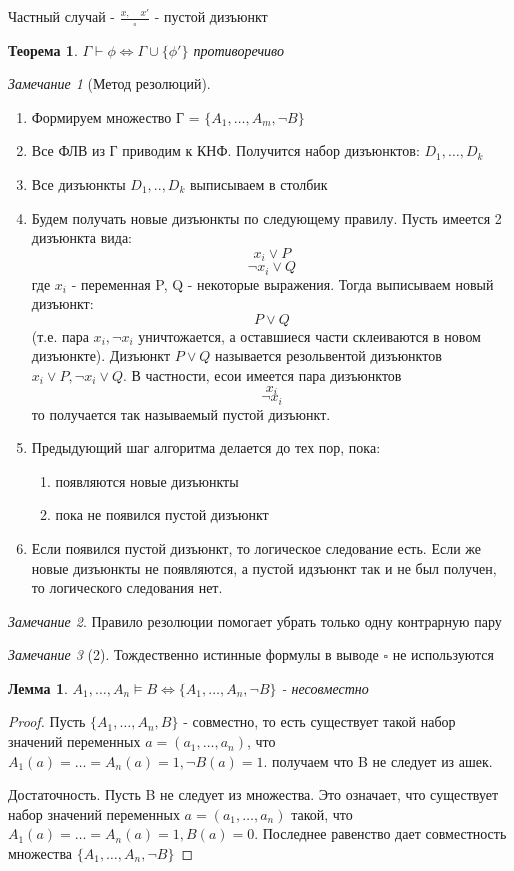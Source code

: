 \documentclass[a4paper]{article}
\newtheorem{theorem}{Теорема}[section]
\newtheorem{lemma}{Лемма}[section]
\theoremstyle{definition}
\theoremstyle{remark}
\newtheorem*{remark}{Замечание}
\begin{document}
    Частный случай - $\frac{x, \quad x'}{\square}$ - пустой дизъюнкт
    \begin{theorem}
		$\Gamma \vdash \phi \Leftrightarrow \Gamma \cup \{\phi'\}$ противоречиво
	\end{theorem}
	\begin{remark}[Метод резолюций]
		\begin{enumerate}
			\item Формируем множество Г = $\{A_1, \dots, A_m, \neg B\}$
			\item Все ФЛВ из Г приводим к КНФ. Получится набор дизъюнктов: $D_1, \dots, D_k$
			\item Все дизъюнкты $D_1, .., D_k$ выписываем в столбик
			\item  Будем получать новые дизъюнкты по следующему правилу. Пусть имеется 2 дизъюнкта вида: $$x_i \vee P$$ $$\neg x_i \vee Q$$
			где $x_i$ - переменная P, Q - некоторые выражения. Тогда выписываем новый дизъюнкт: $$P \vee Q$$
			(т.е. пара $x_i, \neg x_i$ уничтожается, а оставшиеся части склеиваются в новом дизъюнкте). Дизъюнкт $P \vee Q$ называется резольвентой дизъюнктов $x_i \vee P, \neg x_i \vee Q.$ В частности, есои имеется пара дизъюнктов $$x_i$$ $$\neg x_i$$ то получается так называемый пустой дизъюнкт.
			\item Предыдующий шаг алгоритма делается до тех пор, пока:
			\begin{enumerate}
				\item появляются новые дизъюнкты
				\item пока не появился пустой дизъюнкт
			\end{enumerate}
			\item Если появился пустой дизъюнкт, то логическое следование есть. Если же новые дизъюнкты не появляются, а пустой идзъюнкт так и не был получен, то логического следования нет.
		\end{enumerate}
	\end{remark}
    \begin{remark}
        Правило резолюции помогает убрать только одну контрарную пару
    \end{remark}
    \begin{remark}[2]
        Тождественно истинные формулы в выводе $\square$ не используются
    \end{remark}
    \begin{lemma}
        $A_1, \dots, A_n \models B\Leftrightarrow \{A_1, \dots, A_n, \neg B\}$ - несовместно
    \end{lemma}
    \begin{proof}
        Пусть $\{A_1, \dots, A_n, B\}$ - совместно, то есть существует такой набор значений переменных
        $a = (a_1, \dots, a_n)$, что $A_1(a) =\dots = A_n(a) = 1, \neg B(a) = 1$. получаем что B не следует из ашек.

        Достаточность. Пусть B не следует из множества. Это означает, что существует набор значений переменных 
        $a = (a_1, \dots, a_n)$ такой, что $A_1(a) =\dots = A_n(a) = 1, B(a) = 0$. Последнее равенство дает совместность множества
        $\{A_1, \dots, A_n, \neg B\}$
    \end{proof}
\end{document}
